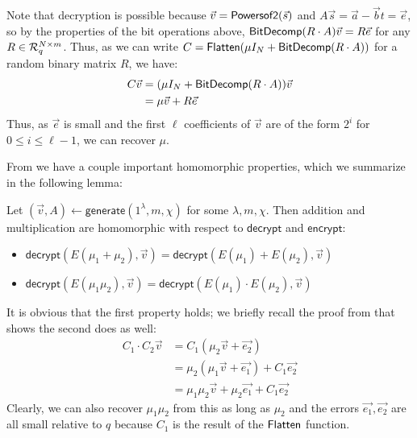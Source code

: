 Note that decryption is possible because $\vec{v} = \mathsf{Powersof2}(\vec{s})$ and $A\vec{s} = \vec{a} - \vec{b}t = \vec{e}$, so by the properties of the bit operations above, $\mathsf{BitDecomp}(R\cdot A)\vec{v} = R\vec{e}$ for any $R \in \mathcal{R}_q^{N \times m}$.  Thus, as we can write $C = \mathsf{Flatten}(\mu I_N + \mathsf{BitDecomp}(R\cdot A))$ for a random binary matrix $R$, we have:
\begin{align*}
C\vec{v} &= (\mu I_N + \mathsf{BitDecomp}(R\cdot A))\vec{v}\\
&= \mu \vec{v} + R\vec{e}
\end{align*}
Thus, as $\vec{e}$ is small and the first $\ell$ coefficients of $\vec{v}$ are of the form $2^i$ for $0 \leq i \leq \ell-1$, we can recover $\mu$.

From \cite{gsw} we have a couple important homomorphic properties, which we summarize in the following lemma:

\begin{lemma}
\label{gswprop}
Let $(\vec{v}, A) \leftarrow \mathsf{generate}(1^\lambda, m, \chi)$ for some $\lambda, m, \chi$.  Then addition and multiplication are homomorphic with respect to $\mathsf{decrypt}$ and $\mathsf{encrypt}$:
\begin{itemize}
\item $\mathsf{decrypt}(E(\mu_1 + \mu_2), \vec{v}) = \mathsf{decrypt}(E(\mu_1) + E(\mu_2), \vec{v})$
\item $\mathsf{decrypt}(E(\mu_1\mu_2), \vec{v}) = \mathsf{decrypt}(E(\mu_1)\cdot E(\mu_2), \vec{v})$
\end{itemize}
\end{lemma}

It is obvious that the first property holds; we briefly recall the proof from \cite{gsw} that shows the second does as well:
\begin{align*}
C_1\cdot C_2\vec{v} &= C_1(\mu_2\vec{v} + \vec{e_2})\\
&= \mu_2(\mu_1\vec{v} + \vec{e_1}) + C_1\vec{e_2}\\
&= \mu_1\mu_2\vec{v} + \mu_2\vec{e_1} + C_1\vec{e_2}
\end{align*}
Clearly, we can also recover $\mu_1\mu_2$ from this as long as $\mu_2$ and the errors $\vec{e_1}, \vec{e_2}$ are all small relative to $q$ because $C_1$ is the result of the $\mathsf{Flatten}$ function.
